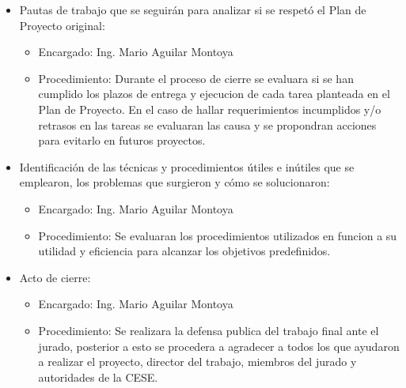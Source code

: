 \documentclass[
11pt, %
codirector, %
]{charter}
\begin{document}
\begin{itemize}
	\item Pautas de trabajo que se seguirán para analizar si se respetó el Plan de Proyecto original:
	\begin{itemize}
		\item Encargado: Ing. Mario Aguilar Montoya
		\item Procedimiento: Durante el proceso de cierre se evaluara si se han cumplido los plazos
		de entrega y ejecucion de cada tarea planteada en el Plan de Proyecto. En el caso de hallar requerimientos incumplidos y/o retrasos en las
		tareas se evaluaran las causa y se propondran acciones para evitarlo en futuros
		proyectos.
	\end{itemize}
	\item Identificación de las técnicas y procedimientos útiles e inútiles que se emplearon, los problemas que surgieron y cómo se solucionaron:
	\begin{itemize}
		\item Encargado: Ing. Mario Aguilar Montoya
		\item Procedimiento: Se evaluaran los procedimientos utilizados en funcion a su utilidad
		y eficiencia para alcanzar los objetivos predefinidos.
	\end{itemize}
	\item Acto de cierre:
	\begin{itemize}
		\item Encargado: Ing. Mario Aguilar Montoya
		\item Procedimiento: Se realizara la defensa publica del trabajo final ante el jurado, posterior a esto se
		procedera a agradecer a todos los que ayudaron a realizar el proyecto, director del
		trabajo, miembros del jurado y autoridades de la CESE.
	\end{itemize}
\end{itemize}
\end{document}
